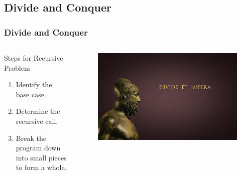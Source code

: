 \documentclass[fleqn, t]{beamer}
\begin{document}
\subsection{Divide and Conquer}
\begin{frame}[c]
  \frametitle{Divide and Conquer}
  \begin{columns}[t]
    \begin{column}{.4\textwidth}
      \begin{block}{Steps for Recursive Problem}
        \begin{enumerate}[<+->]
        \item Identify the base case.
        \item Determine the recursive call.
        \item Break the program down into small pieces to form a whole.
        \end{enumerate}
      \end{block}
    \end{column}

    \begin{column}{.6\textwidth}
      \begin{figure}
        \includegraphics[scale=0.2]{divide.jpg}
      \end{figure}

    \end{column}
  \end{columns}

\end{frame}
\end{document}
